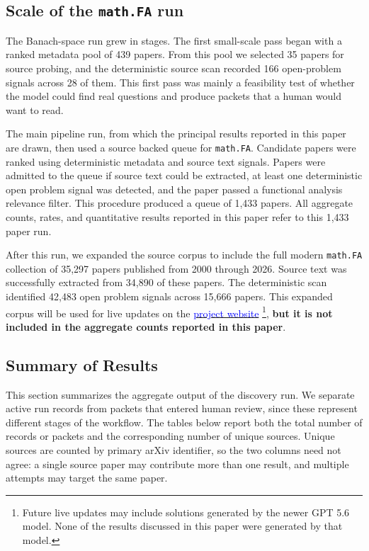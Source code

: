 \documentclass[11pt,reqno]{amsart}
\theoremstyle{plain}
\theoremstyle{definition}
\newcommand{\websiteurl}{https://mathematical-discoveries-in-the-wild.github.io/}
\newcommand{\website}[1][project website]{%
  \href{\websiteurl}{\textcolor{blue}{#1}}%
}
\begin{document}
\subsection{Scale of the \texorpdfstring{\texttt{math.FA}}{math.FA} run}

The Banach-space run grew in stages.  The first small-scale pass began with a ranked metadata pool of 439 papers. From this pool we selected 35 papers for source probing, and the deterministic source scan recorded 166 open-problem signals across 28 of them.  This first pass was mainly a feasibility test of whether the model could find real questions and produce packets that a human would want to read.

The main pipeline run, from which the principal results reported in this paper are drawn, then used a source backed queue for \texttt{math.FA}. Candidate papers were ranked using deterministic metadata and source text signals. Papers were admitted to the queue if source text could be extracted, at least one deterministic open problem signal was detected, and the paper passed a functional analysis relevance filter. This procedure produced a queue of 1,433 papers. All aggregate counts, rates, and quantitative results reported in this paper refer to this 1,433 paper run.

After this run, we expanded the source corpus to include the full modern \texttt{math.FA} collection of 35,297 papers published from 2000 through 2026. Source text was successfully extracted from 34,890 of these papers. The deterministic scan identified 42,483 open problem signals across 15,666 papers. This expanded corpus will be used for live updates on the \website[project website]\footnote{Future live updates may include solutions generated by the newer GPT 5.6 model. None of the results discussed in this paper were generated by that model.}, \textbf{but it is not included in the aggregate counts reported in this paper}.

\subsection{Summary of Results}

This section summarizes the aggregate output of the discovery run. We separate active run records from packets that entered human review, since these represent different stages of the workflow. The tables below report both the total number of records or packets and the corresponding number of unique sources. Unique sources are counted by primary arXiv identifier, so the two columns need not agree: a single source paper may contribute more than one result, and multiple attempts may target the same paper.
\end{document}
